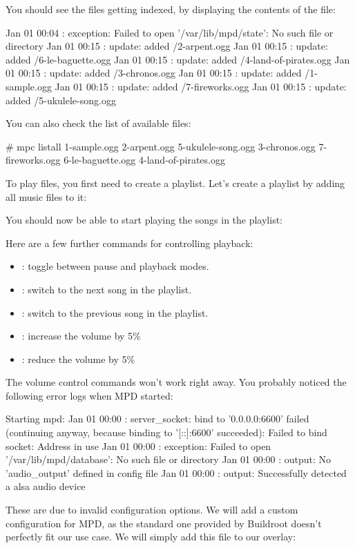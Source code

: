
You should see the files getting indexed, by displaying the contents
of the  file:

\begin{terminaloutput}
Jan 01 00:04 : exception: Failed to open '/var/lib/mpd/state': No such file or directory
Jan 01 00:15 : update: added /2-arpent.ogg
Jan 01 00:15 : update: added /6-le-baguette.ogg
Jan 01 00:15 : update: added /4-land-of-pirates.ogg
Jan 01 00:15 : update: added /3-chronos.ogg
Jan 01 00:15 : update: added /1-sample.ogg
Jan 01 00:15 : update: added /7-fireworks.ogg
Jan 01 00:15 : update: added /5-ukulele-song.ogg
\end{terminaloutput}

You can also check the list of available files:
\begin{terminaloutput}
# mpc listall
1-sample.ogg
2-arpent.ogg
5-ukulele-song.ogg
3-chronos.ogg
7-fireworks.ogg
6-le-baguette.ogg
4-land-of-pirates.ogg
\end{terminaloutput}

To play files, you first need to create a playlist. Let's create a
playlist by adding all music files to it:


You should now be able to start playing the songs in the playlist:


Here are a few further commands for controlling playback:
\begin{itemize}
\item {}: toggle between pause and playback modes.
\item {}: switch to the next song in the playlist.
\item {}: switch to the previous song in the playlist.
\item {}: increase the volume by 5\%
\item {}: reduce the volume by 5\%
\end{itemize}

The volume control commands won't work right away. You probably noticed
the following error logs when MPD started:
\begin{terminaloutput}
Starting mpd: Jan 01 00:00 : server_socket: bind to '0.0.0.0:6600' failed (continuing anyway, because binding to '[::]:6600' succeeded): Failed to bind socket: Address
in use
Jan 01 00:00 : exception: Failed to open '/var/lib/mpd/database': No such file or directory
Jan 01 00:00 : output: No 'audio_output' defined in config file
Jan 01 00:00 : output: Successfully detected a alsa audio device
\end{terminaloutput}
These are due to invalid configuration options. We will add a custom
configuration for MPD, as the standard one provided by Buildroot doesn't
perfectly fit our use case. We will simply add this file to our overlay:


